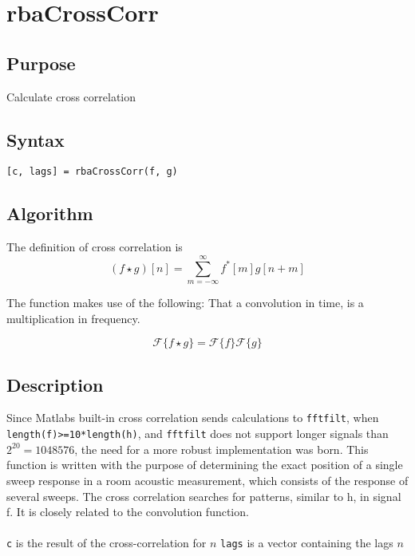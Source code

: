 
\chapter{rbaCrossCorr} %
\label{cha:rbaCrossCorr} %

\section{Purpose} %
\label{sec:rbaCrossCorr_purpose}

Calculate cross correlation



\section{Syntax} %
\label{sec:rbaCrossCorr_syntax}


\texttt{[c, lags] = rbaCrossCorr(f, g)}


\section{Algorithm} %
\label{sec:rbaCrossCorr_algorithm}

The definition of cross correlation is
\begin{equation*}
    (f \star g) [n] = \sum_{m=-\infty}^{\infty} f^*[m]g[n+m]
\end{equation*}

The function makes use of the following: That a convolution in time, is a multiplication in frequency.

\begin{equation*}
     \mathcal{F}\{ f \star g\} = \mathcal{F}\{ f\} \mathcal{F}\{ g \}
\end{equation*}


\section{Description} %
\label{sec:rbaCrossCorr_description}
    Since Matlabs built-in cross correlation sends calculations to
    \texttt{fftfilt}, when \texttt{length(f)>=10*length(h)}, and \texttt{fftfilt} does not support
    longer signals than $2^{20}=1048576$, the need for a more robust
    implementation was born.
    This function is written with the purpose of determining the exact
    position of a single sweep response in a room acoustic measurement,
    which consists of the response of several sweeps.
    The cross correlation searches for patterns, similar to h, in
    signal f. It is closely related to the convolution function.\\
    \\
    \texttt{c} is the result of the cross-correlation for $n$
    \texttt{lags} is a vector containing the lags $n$


